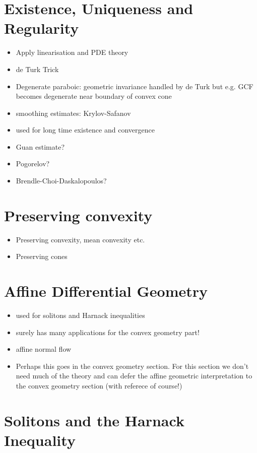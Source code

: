 \chapter{Existence, Uniqueness and Regularity}

\begin{itemize}
\item Apply linearisation and PDE theory
\item de Turk Trick
\item Degenerate paraboic: geometric invariance handled by de Turk but e.g. GCF becomes degenerate near boundary of convex cone
\item smoothing estimates: Krylov-Safanov
\item used for long time existence and convergence
\item Guan estimate?
\item Pogorelov?
\item Brendle-Choi-Daskalopoulos?
\end{itemize}

\chapter{Preserving convexity}

\begin{itemize}
\item Preserving convexity, mean convexity etc.
\item Preserving cones
\end{itemize}

\chapter{Affine Differential Geometry}

\begin{itemize}
\item used for solitons and Harnack inequalities
\item surely has many applications for the convex geometry part!
\item affine normal flow
\item Perhaps this goes in the convex geometry section. For this section we don't need much of the theory and can defer the affine geometric interpretation to the convex geometry section (with referece of course!)
\end{itemize}

\chapter{Solitons and the Harnack Inequality}

